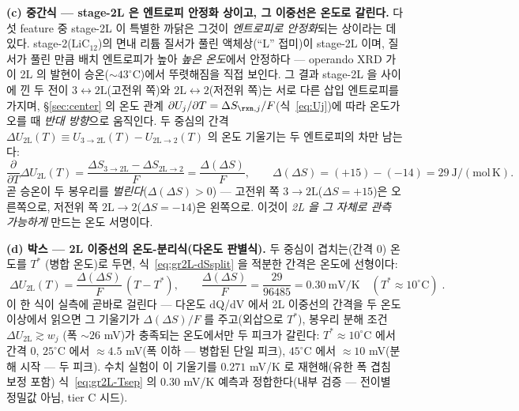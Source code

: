 \textbf{(c) 중간식 --- stage-2L 은 엔트로피 안정화 상이고, 그 이중선은 온도로 갈린다.} 다섯 feature 중
stage-2L 이 특별한 까닭은 그것이 \emph{엔트로피로 안정화}되는 상이라는 데 있다. stage-2($\mathrm{LiC_{12}}$)의
면내 리튬 질서가 풀린 액체상(``L'' 접미)이 stage-2L 이며, 질서가 풀린 만큼 배치 엔트로피가 높아 \emph{높은
온도}에서 안정하다 --- operando XRD 가 이 2L 의 발현이 승온($\sim$$43^\circ$C)에서 뚜렷해짐을 직접
보인다\cite{schmitt2022}. 그 결과 stage-2L 을 사이에 낀 두 전이 $3\!\leftrightarrow\!2\mathrm L$(고전위 쪽)와
$2\mathrm L\!\leftrightarrow\!2$(저전위 쪽)는 서로 다른 삽입 엔트로피를 가지며, \S\ref{sec:center} 의 온도 관계
$\partial U_j/\partial T=\Delta S_{\rxn,j}/F$(식~\eqref{eq:Uj})에 따라 온도가 오를 때 \emph{반대 방향}으로
움직인다. 두 중심의 간격 $\Delta U_{2\mathrm L}(T)\equiv U_{3\to2\mathrm L}(T)-U_{2\mathrm L\to2}(T)$ 의 온도
기울기는 두 엔트로피의 차만 남는다:
\begin{equation}
\frac{\partial}{\partial T}\Delta U_{2\mathrm L}(T)
=\frac{\Delta S_{3\to2\mathrm L}-\Delta S_{2\mathrm L\to2}}{F}
=\frac{\Delta(\Delta S)}{F},
\qquad \Delta(\Delta S)=(+15)-(-14)=29\ \mathrm{J/(mol\,K)}.
\label{eq:gr2L-dSsplit}
\end{equation}
곧 승온이 두 봉우리를 \emph{벌린다}($\Delta(\Delta S)>0$) --- 고전위 쪽 $3\!\to\!2\mathrm L$($\Delta S{=}+15$)은
오른쪽으로, 저전위 쪽 $2\mathrm L\!\to\!2$($\Delta S{=}-14$)은 왼쪽으로. 이것이 \emph{2L 을 그 자체로 관측
가능하게} 만드는 온도 서명이다.

\textbf{(d) 박스 --- 2L 이중선의 온도-분리식(다온도 판별식).} 두 중심이 겹치는(간격 $0$) 온도를 $T^{*}$
(병합 온도)로 두면, 식~\eqref{eq:gr2L-dSsplit} 을 적분한 간격은 온도에 선형이다:
\begin{equation}
\boxed{\;
\Delta U_{2\mathrm L}(T)=\frac{\Delta(\Delta S)}{F}\,(T-T^{*}),
\qquad
\frac{\Delta(\Delta S)}{F}=\frac{29}{96485}=0.30\ \mathrm{mV/K}
\quad(T^{*}\approx10^{\circ}\mathrm C)\;.}
\label{eq:gr2L-Tsep}
\end{equation}
이 한 식이 실측에 곧바로 걸린다 --- 다온도 dQ/dV 에서 2L 이중선의 간격을 두 온도 이상에서 읽으면 그
기울기가 $\Delta(\Delta S)/F$ 를 주고(외삽으로 $T^{*}$), 봉우리 분해 조건 $\Delta U_{2\mathrm L}\gtrsim w_j$
(폭 $\sim$$26$ mV)가 충족되는 온도에서만 두 피크가 갈린다: $T^{*}\!\approx\!10^{\circ}$C 에서 간격 $0$,
$25^{\circ}$C 에서 $\approx4.5$ mV(폭 이하 --- 병합된 단일 피크), $45^{\circ}$C 에서 $\approx10$ mV(분해
시작 --- 두 피크). 수치 실험이 이 기울기를 $0.271$ mV/K 로 재현해(유한 폭 겹침 보정 포함) 식~\eqref{eq:gr2L-Tsep} 의
$0.30$ mV/K 예측과 정합한다(내부 검증 --- 전이별 정밀값 아님, tier C 시드).

